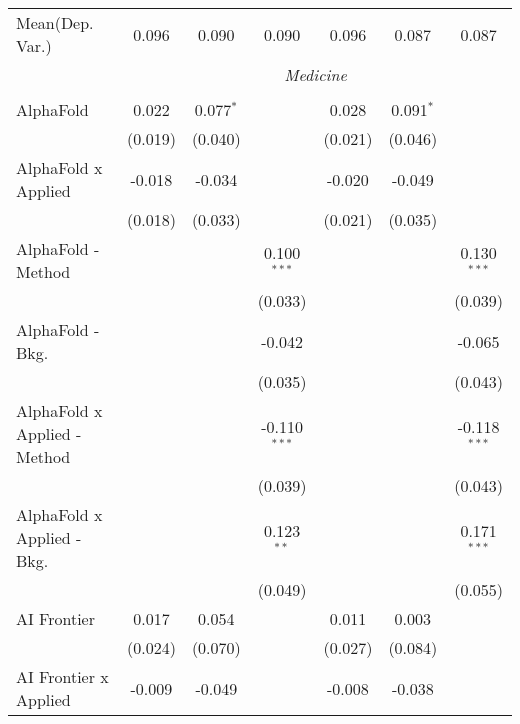 \begin{tabular}{lcccccc}
Mean(Dep. Var.) & 0.096 & 0.090 & 0.090 & 0.096 & 0.087 & 0.087 \\
 & \multicolumn{6}{c}{\textit{Medicine}} \\ \\
   AlphaFold                      & 0.022         & 0.077$^{*}$ &                & 0.028         & 0.091$^{*}$   &   \\   
                                  & (0.019)       & (0.040)     &                & (0.021)       & (0.046)       &   \\   
   AlphaFold x Applied            & -0.018        & -0.034      &                & -0.020        & -0.049        &   \\   
                                  & (0.018)       & (0.033)     &                & (0.021)       & (0.035)       &   \\   
   AlphaFold - Method             &               &             & 0.100$^{***}$  &               &               & 0.130$^{***}$\\   
                                  &               &             & (0.033)        &               &               & (0.039)\\   
   AlphaFold - Bkg.               &               &             & -0.042         &               &               & -0.065\\   
                                  &               &             & (0.035)        &               &               & (0.043)\\   
   AlphaFold x Applied - Method   &               &             & -0.110$^{***}$ &               &               & -0.118$^{***}$\\   
                                  &               &             & (0.039)        &               &               & (0.043)\\   
   AlphaFold x Applied - Bkg.     &               &             & 0.123$^{**}$   &               &               & 0.171$^{***}$\\   
                                  &               &             & (0.049)        &               &               & (0.055)\\   
   AI Frontier                    & 0.017         & 0.054       &                & 0.011         & 0.003         &   \\   
                                  & (0.024)       & (0.070)     &                & (0.027)       & (0.084)       &   \\   
   AI Frontier x Applied          & -0.009        & -0.049      &                & -0.008        & -0.038        &   \\   

\end{tabular}
